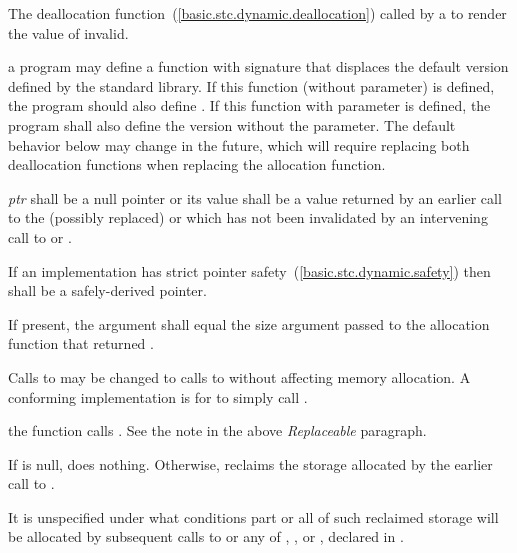 \begin{itemdescr}
\pnum
\effects
The
deallocation function~(\ref{basic.stc.dynamic.deallocation})
called by a
to render the value of  invalid.

\pnum
\replaceable
a \Cpp program may define a function with signature
that displaces the default version defined by the
\Cpp standard library. If this function (without  parameter) is defined,
the program should also define
.
If this function with  parameter is defined, the program shall also
define the version without the  parameter.
\enternote The default behavior below may change in the future, which will require
replacing both deallocation functions when replacing the allocation function.
\exitnote

\pnum
\requires
\textit{ptr} shall be a null pointer or
its value shall be a value returned by an
earlier call to the (possibly replaced)
or
which has not been invalidated by an intervening call to
 or
.

\pnum
\requires
If an implementation has strict pointer safety~(\ref{basic.stc.dynamic.safety})
then  shall be a safely-derived pointer.

\pnum
\requires If present, the  argument shall equal the size
argument passed to the allocation function that returned .

\pnum
\required Calls to  may be changed
to calls to  without affecting memory allocation.
\enternote A conforming implementation is for
 to simply call
. \exitnote

\pnum
{} the function  calls
.
\enternote See the note in the above \textit{Replaceable} paragraph. \exitnote

\pnum
{}
If  is null, does nothing. Otherwise, reclaims the
storage allocated by the earlier call to .

\pnum
\remarks
It is unspecified under what conditions part or all of such
%
reclaimed storage will be allocated by subsequent
calls to
or any of
,
,
or
,
declared in
.
\end{itemdescr}

